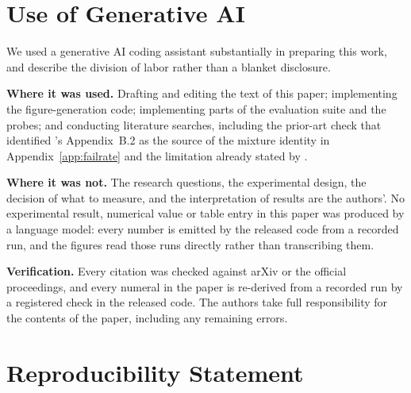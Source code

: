 \section*{Use of Generative AI}

We used a generative AI coding assistant substantially in preparing this work,
and describe the division of labor rather than a blanket disclosure.

\textbf{Where it was used.} Drafting and editing the text of this paper;
implementing the figure-generation code; implementing parts of the evaluation
suite and the probes; and conducting literature
searches, including the prior-art check that identified
\citet{binkowski2018kid}'s Appendix~B.2 as the source of the mixture identity in
Appendix~\ref{app:failrate} and the limitation already stated by
\citet{merino2026dreamcubed}.

\textbf{Where it was not.} The research questions, the experimental design, the
decision of what to measure, and the interpretation of results are the authors'.
No experimental result, numerical value or table entry in this paper was
produced by a language model: every number is emitted by the released code from
a recorded run, and the figures read those runs directly rather than
transcribing them.

\textbf{Verification.} Every citation was checked against arXiv or the official
proceedings, and every numeral in the paper is re-derived from a recorded run by a
registered check in the released code. The authors take full responsibility for the
contents of the paper, including any remaining errors.

\section*{Reproducibility Statement}

